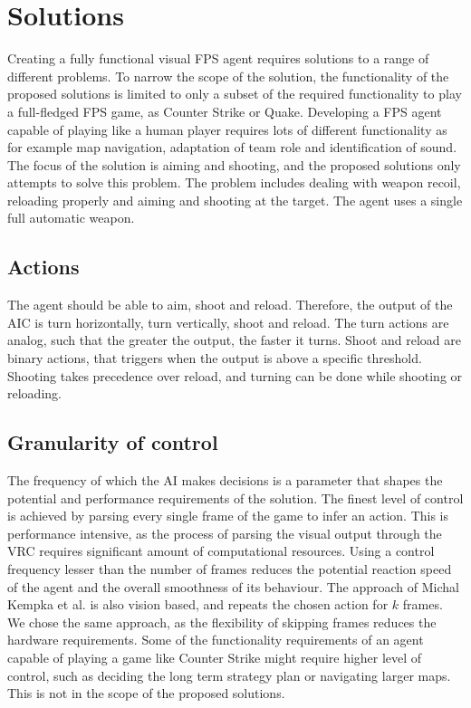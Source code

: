 
\section{Solutions}
\label{sec:solutions}
Creating a fully functional visual FPS agent requires solutions to a range of different problems. To narrow the scope of the solution, the functionality of the proposed solutions is limited to only a subset of the required functionality to play a full-fledged FPS game, as Counter Strike or Quake. Developing a FPS agent capable of playing like a human player requires lots of different functionality as for example map navigation, adaptation of team role and identification of sound. The focus of the solution is aiming and shooting, and the proposed solutions only attempts to solve this problem. The problem includes dealing with weapon recoil, reloading properly and aiming and shooting at the target. The agent uses a single full automatic weapon.

\subsection{Actions}
The agent should be able to aim, shoot and reload. Therefore, the output of the AIC is turn horizontally, turn vertically, shoot and reload. The turn actions are analog, such that the greater the output, the faster it turns. Shoot and reload are binary actions, that triggers when the output is above a specific threshold. Shooting takes precedence over reload, and turning can be done while shooting or reloading.

\subsection{Granularity of control}
The frequency of which the AI makes decisions is a parameter that shapes the potential and performance requirements of the solution. The finest level of control is achieved by parsing every single frame of the game to infer an action. This is performance intensive, as the process of parsing the visual output through the VRC requires significant amount of computational resources. Using a control frequency lesser than the number of frames reduces the potential reaction speed of the agent and the overall smoothness of its behaviour. The approach of Michal Kempka et al.\cite{vizdoom} is also vision based, and repeats the chosen action for $k$ frames. We chose the same approach, as the flexibility of skipping frames reduces the hardware requirements.
Some of the functionality requirements of an agent capable of playing a game like Counter Strike might require higher level of control, such as deciding the long term strategy plan or navigating larger maps. This is not in the scope of the proposed solutions.

